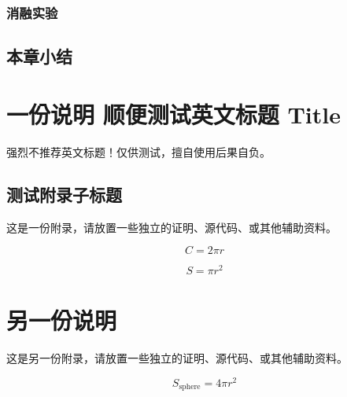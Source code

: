 \documentclass[lang=chs, degree=master, blindreview=false, adobe=false]{yanputhesis}
\begin{document}
\subsection{消融实验}
\section{本章小结}


\cleardoublepage
\appendix
\chapter{一份说明 顺便测试英文标题 Title}

强烈不推荐英文标题！仅供测试，擅自使用后果自负。

\section{测试附录子标题}

这是一份附录，请放置一些独立的证明、源代码、或其他辅助资料。


\begin{equation}
    C = 2 \pi r
\end{equation}

\begin{equation}
    S = \pi r^2
\end{equation}

\cleardoublepage

\chapter{另一份说明}

这是另一份附录，请放置一些独立的证明、源代码、或其他辅助资料。


\begin{equation}
    S_{\text{sphere}} = 4 \pi r^2
\end{equation}
\end{document}
